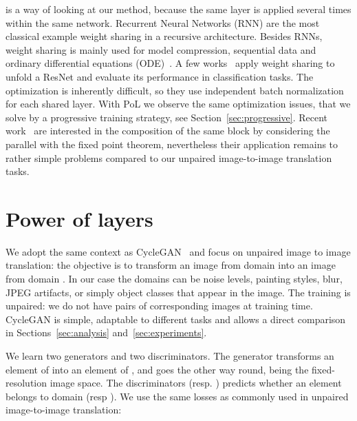 \documentclass[a4paper,10pt]{extarticle}
\makeatletter
\renewcommand{\paragraph}{\@startsection{paragraph}{4}{\z@}{0em}{-0.5em}{\normalfont\normalsize\bfseries}}
\makeatother
\begin{document}
\paragraph{Weight sharing}
is a way of looking at our method, because the same layer is applied several times within the same network.
Recurrent Neural Networks (RNN) are the most classical example weight sharing in a recursive architecture.
Besides RNNs, weight sharing is mainly used for model compression, sequential data and ordinary differential equations (ODE)~\cite{Gao2019CrossDM,Polino2018ModelCV,Han2015DeepCC,Chen2018NeuralOD}. 
A few works~\cite{Jastrzebski2017ResidualCE,Zhang2018RecurrentCA} apply weight sharing to unfold a ResNet and evaluate its performance in classification tasks.
The optimization is inherently difficult, so they use independent batch normalization for each shared layer.
With PoL we observe the same optimization issues, that we solve by a progressive training strategy, see Section~\ref{sec:progressive}.
Recent work~\cite{Jeon2020DifferentiableFI} are interested in the composition of the same block by considering the parallel with the fixed point theorem, nevertheless their application remains to rather simple problems compared to our unpaired image-to-image translation tasks. 
 \section{Power of layers}\label{sec:method}

\newcommand\norm[1]{\left\lVert#1\right\rVert}
We adopt the same context as CycleGAN~\cite{Zhu2017CycleGAN} and focus on unpaired image to image translation: the objective is to transform an image from domain  into an image from domain .
In our case the domains can be noise levels, painting styles, blur, JPEG artifacts, or simply object classes that appear in the image.
The training is unpaired: we do not have pairs of corresponding images at training time. 
CycleGAN is simple, adaptable to different tasks and allows a direct comparison in Sections~\ref{sec:analysis} and~\ref{sec:experiments}. 

We learn two generators and two discriminators.
The generator  transforms an element of  into an element of , and  goes the other way round,  being the fixed-resolution image space.
The discriminators  (resp. ) predicts whether an element belongs to domain  (resp ).
We use the same losses as commonly used in unpaired image-to-image translation:
\end{document}

